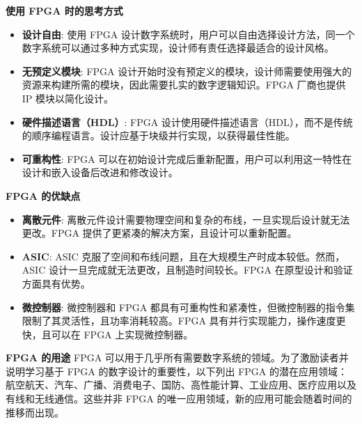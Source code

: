 \documentclass[
  ignorenonframetext,
  chinese,
]{beamer}
\providecommand{\tightlist}{%
  \setlength{\itemsep}{0pt}\setlength{\parskip}{0pt}}
\begin{document}
\begin{frame}
\begin{block}{\textbf{使用 FPGA 时的思考方式}}
\label{ux4f7fux7528-fpga-ux65f6ux7684ux601dux8003ux65b9ux5f0f}
\begin{itemize}
\tightlist
\item
  \textbf{设计自由}: 使用 FPGA
  设计数字系统时，用户可以自由选择设计方法，同一个数字系统可以通过多种方式实现，设计师有责任选择最适合的设计风格。
\item
  \textbf{无预定义模块}: FPGA
  设计开始时没有预定义的模块，设计师需要使用强大的资源来构建所需的模块，因此需要扎实的数字逻辑知识。FPGA
  厂商也提供 IP 模块以简化设计。
\item
  \textbf{硬件描述语言（HDL）}: FPGA
  设计使用硬件描述语言（HDL），而不是传统的顺序编程语言。设计应基于块级并行实现，以获得最佳性能。
\item
  \textbf{可重构性}: FPGA
  可以在初始设计完成后重新配置，用户可以利用这一特性在设计和嵌入设备后改进和修改设计。
\end{itemize}
\end{block}
\end{frame}

\begin{frame}
\begin{block}{\textbf{FPGA 的优缺点}}
\label{fpga-ux7684ux4f18ux7f3aux70b9}
\begin{itemize}
\tightlist
\item
  \textbf{离散元件}:
  离散元件设计需要物理空间和复杂的布线，一旦实现后设计就无法更改。FPGA
  提供了更紧凑的解决方案，且设计可以重新配置。
\item
  \textbf{ASIC}: ASIC
  克服了空间和布线问题，且在大规模生产时成本较低。然而，ASIC
  设计一旦完成就无法更改，且制造时间较长。FPGA
  在原型设计和验证方面具有优势。
\item
  \textbf{微控制器}: 微控制器和 FPGA
  都具有可重构性和紧凑性，但微控制器的指令集限制了其灵活性，且功率消耗较高。FPGA
  具有并行实现能力，操作速度更快，且可以在 FPGA 上实现微控制器。
\end{itemize}
\end{block}
\end{frame}

\begin{frame}
\begin{block}{\textbf{FPGA 的用途}}
\label{fpga-ux7684ux7528ux9014}
FPGA 可以用于几乎所有需要数字系统的领域。为了激励读者并说明学习基于 FPGA
的数字设计的重要性，以下列出 FPGA
的潜在应用领域：航空航天、汽车、广播、消费电子、国防、高性能计算、工业应用、医疗应用以及有线和无线通信。这些并非
FPGA 的唯一应用领域，新的应用可能会随着时间的推移而出现。
\end{block}
\end{frame}
\end{document}
